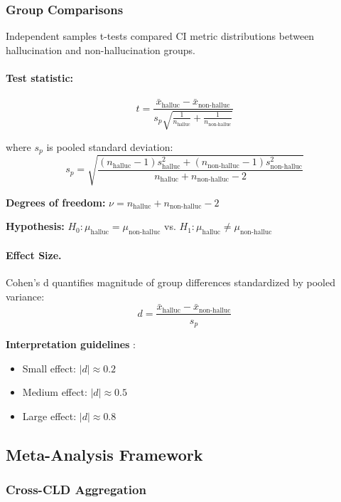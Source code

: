 \subsubsection{Group Comparisons}

Independent samples t-tests compared CI metric distributions between hallucination and non-hallucination groups.

\paragraph{Test statistic:}
\[
t = \frac{\bar{x}_{\text{halluc}} - \bar{x}_{\text{non-halluc}}}{s_p \sqrt{\frac{1}{n_{\text{halluc}}} + \frac{1}{n_{\text{non-halluc}}}}}
\]

where \(s_p\) is pooled standard deviation:
\[
s_p = \sqrt{\frac{(n_{\text{halluc}}-1)s_{\text{halluc}}^2 + (n_{\text{non-halluc}}-1)s_{\text{non-halluc}}^2}{n_{\text{halluc}}+n_{\text{non-halluc}}-2}}
\]

\textbf{Degrees of freedom:} \(\nu = n_{\text{halluc}} + n_{\text{non-halluc}} - 2\)

\textbf{Hypothesis:} \(H_0: \mu_{\text{halluc}} = \mu_{\text{non-halluc}}\) vs. \(H_1: \mu_{\text{halluc}} \neq \mu_{\text{non-halluc}}\)

\paragraph{Effect Size.} Cohen's d quantifies magnitude of group differences standardized by pooled variance:
\[
d = \frac{\bar{x}_{\text{halluc}} - \bar{x}_{\text{non-halluc}}}{s_p}
\]

\textbf{Interpretation guidelines} \cite{cohen1988statistical}:
\begin{itemize}
    \item Small effect: \(|d| \approx 0.2\)
    \item Medium effect: \(|d| \approx 0.5\)
    \item Large effect: \(|d| \approx 0.8\)
\end{itemize}

\subsection{Meta-Analysis Framework}

\subsubsection{Cross-CLD Aggregation}

